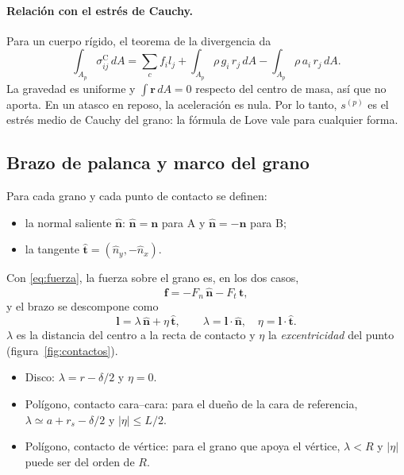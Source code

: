 \documentclass[11pt,a4paper]{article}
\newcommand{\vect}[1]{\mathbf{#1}}
\newcommand{\n}{\vect{n}}
\newcommand{\nh}{\hat{\vect{n}}}
\newcommand{\tvh}{\hat{\vect{t}}}
\newcommand{\lv}{\vect{l}}
\newcommand{\f}{\vect{f}}
\begin{document}
\paragraph{Relación con el estrés de Cauchy.} Para un cuerpo rígido, el
teorema de la divergencia da
\begin{equation}
  \int_{A_p}\sigma^{\text{C}}_{ij}\,dA = \sum_c f_i l_j
    + \int_{A_p} \rho\, g_i\, r_j\,dA - \int_{A_p}\rho\, a_i\, r_j\,dA .
\end{equation}
La gravedad es uniforme y $\int \vect{r}\,dA = 0$ respecto del centro de
masa, así que no aporta. En un atasco en reposo, la aceleración es nula.
Por lo tanto, $s^{(p)}$ es el estrés medio de Cauchy del grano: la
fórmula de Love vale para cualquier forma.

\subsection{Brazo de palanca y marco del grano}

Para cada grano y cada punto de contacto se definen:
\begin{itemize}
  \item la normal saliente $\nh$: $\nh = \n$ para A y $\nh = -\n$ para B;
  \item la tangente $\tvh = (\hat n_y, -\hat n_x)$.
\end{itemize}
Con \eqref{eq:fuerza}, la fuerza sobre el grano es, en los dos casos,
\begin{equation}
  \f = -F_n\,\nh - F_t\,\tvh ,
\end{equation}
y el brazo se descompone como
\begin{equation}
  \lv = \lambda\,\nh + \eta\,\tvh, \qquad \lambda = \lv\cdot\nh, \quad
  \eta = \lv\cdot\tvh .
\end{equation}
$\lambda$ es la distancia del centro a la recta de contacto y $\eta$ la
\emph{excentricidad} del punto (figura~\ref{fig:contactos}).

\begin{itemize}
  \item Disco: $\lambda = r - \delta/2$ y $\eta = 0$.
  \item Polígono, contacto cara--cara: para el dueño de la cara de
    referencia, $\lambda \simeq a + r_s - \delta/2$ y $|\eta| \le L/2$.
  \item Polígono, contacto de vértice: para el grano que apoya el
    vértice, $\lambda < R$ y $|\eta|$ puede ser del orden de $R$.
\end{itemize}
\end{document}
